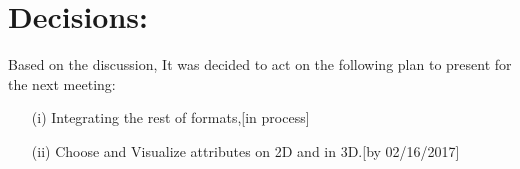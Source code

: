 \documentclass[a4paper, 11pt]{article}
\begin{document}
	\section*{Decisions:}
	
	Based on the discussion, It was decided to act on the following plan to present for the next meeting:
	\begin{itemize}
		\item[(i)] Integrating the rest of formats,\hfill {\color{RedOrange}[in process]}
		\item[(ii)] Choose and Visualize attributes on 2D and in 3D.\hfill {\color{Red}[by 02/16/2017]}
	\end{itemize}
\end{document}
